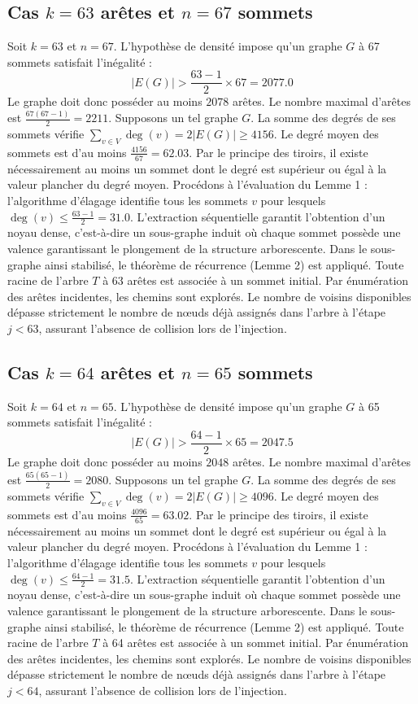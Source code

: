\documentclass[12pt,a4paper]{article}
\begin{document}
\subsection{Cas $k = 63$ arêtes et $n = 67$ sommets}
Soit $k = 63$ et $n = 67$. L'hypothèse de densité impose qu'un graphe $G$ à 67 sommets satisfait l'inégalité :
$$ |E(G)| > \frac{63-1}{2} \times 67 = 2077.0 $$
Le graphe doit donc posséder au moins $2078$ arêtes. Le nombre maximal d'arêtes est $\frac{67(67-1)}{2} = 2211$.
Supposons un tel graphe $G$. La somme des degrés de ses sommets vérifie $\sum_{v \in V} \deg(v) = 2|E(G)| \geq 4156$.
Le degré moyen des sommets est d'au moins $\frac{4156}{67} = 62.03$.
Par le principe des tiroirs, il existe nécessairement au moins un sommet dont le degré est supérieur ou égal à la valeur plancher du degré moyen.
Procédons à l'évaluation du Lemme 1 : l'algorithme d'élagage identifie tous les sommets $v$ pour lesquels $\deg(v) \leq \frac{63-1}{2} = 31.0$.
L'extraction séquentielle garantit l'obtention d'un noyau dense, c'est-à-dire un sous-graphe induit où chaque sommet possède une valence garantissant le plongement de la structure arborescente.
Dans le sous-graphe ainsi stabilisé, le théorème de récurrence (Lemme 2) est appliqué. Toute racine de l'arbre $T$ à 63 arêtes est associée à un sommet initial. Par énumération des arêtes incidentes, les chemins sont explorés. Le nombre de voisins disponibles dépasse strictement le nombre de nœuds déjà assignés dans l'arbre à l'étape $j < 63$, assurant l'absence de collision lors de l'injection.

\subsection{Cas $k = 64$ arêtes et $n = 65$ sommets}
Soit $k = 64$ et $n = 65$. L'hypothèse de densité impose qu'un graphe $G$ à 65 sommets satisfait l'inégalité :
$$ |E(G)| > \frac{64-1}{2} \times 65 = 2047.5 $$
Le graphe doit donc posséder au moins $2048$ arêtes. Le nombre maximal d'arêtes est $\frac{65(65-1)}{2} = 2080$.
Supposons un tel graphe $G$. La somme des degrés de ses sommets vérifie $\sum_{v \in V} \deg(v) = 2|E(G)| \geq 4096$.
Le degré moyen des sommets est d'au moins $\frac{4096}{65} = 63.02$.
Par le principe des tiroirs, il existe nécessairement au moins un sommet dont le degré est supérieur ou égal à la valeur plancher du degré moyen.
Procédons à l'évaluation du Lemme 1 : l'algorithme d'élagage identifie tous les sommets $v$ pour lesquels $\deg(v) \leq \frac{64-1}{2} = 31.5$.
L'extraction séquentielle garantit l'obtention d'un noyau dense, c'est-à-dire un sous-graphe induit où chaque sommet possède une valence garantissant le plongement de la structure arborescente.
Dans le sous-graphe ainsi stabilisé, le théorème de récurrence (Lemme 2) est appliqué. Toute racine de l'arbre $T$ à 64 arêtes est associée à un sommet initial. Par énumération des arêtes incidentes, les chemins sont explorés. Le nombre de voisins disponibles dépasse strictement le nombre de nœuds déjà assignés dans l'arbre à l'étape $j < 64$, assurant l'absence de collision lors de l'injection.
\end{document}
